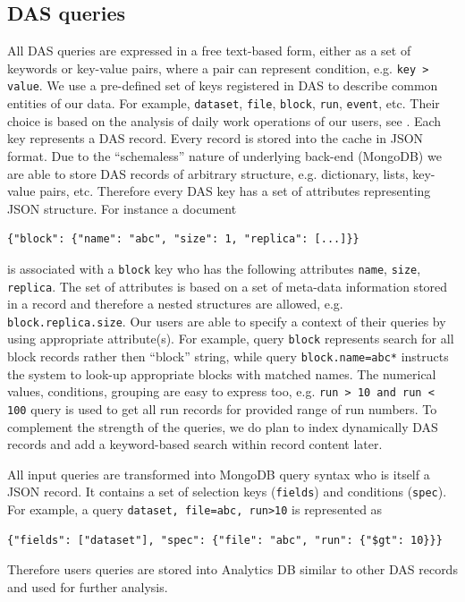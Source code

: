 \documentclass[1p,times]{elsarticle}
\begin{document}
\subsection{DAS queries}
All DAS queries are expressed in a free text-based form, either as a 
set of keywords or key-value pairs, where a pair can represent
condition, e.g. \verb+key > value+. We use a pre-defined set of keys registered 
in DAS to describe common entities of our data. For example, \verb+dataset+, 
\verb+file+, \verb+block+, \verb+run+, \verb+event+, etc. Their choice
is based on the analysis of daily work operations of our users, see \cite{DBS07}.
Each key represents a DAS record. Every record is stored into the cache
in JSON format. Due to the ``schemaless'' nature of underlying back-end (MongoDB)
we are able to store DAS records of arbitrary structure, e.g.
dictionary, lists, key-value pairs, etc. Therefore every DAS key has a 
set of attributes representing JSON structure. For instance a document
\begin{verbatim}
{"block": {"name": "abc", "size": 1, "replica": [...]}}
\end{verbatim}
is associated with a \verb+block+ key who has the following attributes
\verb+name+, \verb+size+, \verb+replica+. The set of attributes is based 
on a set of meta-data information stored in a record and therefore
a nested structures are allowed, e.g. \verb+block.replica.size+. Our users 
are able to specify a context of their queries by using appropriate 
attribute(s). For example, query \verb+block+ represents search for all
block records rather then ``block'' string, while query
\verb+block.name=abc*+ instructs the system to look-up appropriate blocks
with matched names. The numerical values, conditions, grouping are
easy to express too, e.g. \verb+run > 10 and run < 100+ query 
is used to get all run records for provided range of run numbers. 
To complement the strength of the queries, we do plan to index 
dynamically DAS records and add a keyword-based 
search within record content later.

All input queries are transformed into MongoDB query syntax who is itself
a JSON record. It contains a set of selection 
keys (\verb+fields+) and conditions (\verb+spec+). For example, a query
\verb+dataset, file=abc, run>10+
is represented as
\begin{verbatim}
{"fields": ["dataset"], "spec": {"file": "abc", "run": {"$gt": 10}}}
\end{verbatim}
Therefore users queries are stored into Analytics DB similar to other DAS 
records and used for further analysis.
\end{document}
